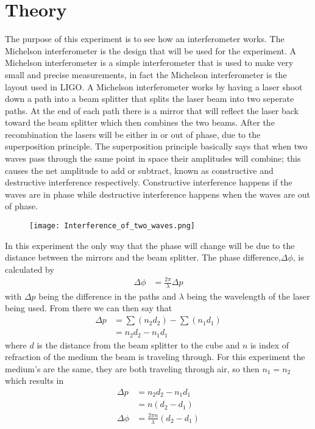 \section{Theory}

The purpose of this experiment is to see how an interferometer works. The
Michelson interferometer is the design that will be used for the experiment. A
Michelson interferometer is a simple interferometer that is used to make very
small and precise measurements, in fact the Michelson interferometer is the
layout used in LIGO\@. A Michelson interferometer works by having a laser shoot
down a path into a beam splitter that splits the laser beam into two seperate
paths. At the end of each path there is a mirror that will reflect the laser
back toward the beam splitter which then combines the two beams. After the
recombination the lasers will be either in or out of phase, due to the
superposition principle. The superposition principle basically says that when
two waves pass through the same point in space their amplitudes will combine;
this causes the net amplitude to add or subtract, known as constructive and
destructive interference respectively. Constructive interference happens if the
waves are in phase while destructive interference happens when the waves are out
of phase.

\begin{figure}[ht!]
\centering
\texttt{[image: Interference\_of\_two\_waves.png]}
\end{figure}

In this experiment the only way that the phase will change will be due to the distance between the mirrors and the beam splitter. The phase difference,$\Delta \phi$, is calculated by 
	\begin{align}
		\nonumber \Delta \phi &=\frac{2\pi}{\lambda} \Delta p
	\end{align}
with $\Delta p$ being the difference in the paths and $\lambda$ being the wavelength of the laser being used. From there we can then say that 
	\begin{align}
		\nonumber \Delta p &=\sum(n_2 d_2)-\sum(n_1 d_1) \\
		\nonumber		&=n_2 d_2 - n_1 d_1
	\end{align} 
where $d$ is the distance from the beam splitter to the cube and $n$ is index of refraction of the medium the beam is traveling through. For this experiment the medium's are the same, they are both traveling through air, so then $n_1=n_2$ which results in
	\begin{align}
		\nonumber \Delta p &= n_2 d_2 - n_1 d_1 \\
		\nonumber 	&= n(d_2 - d_1) \\
		\nonumber \Delta \phi &=\frac{2\pi n}{\lambda} (d_2 - d_1)
	\end{align}

